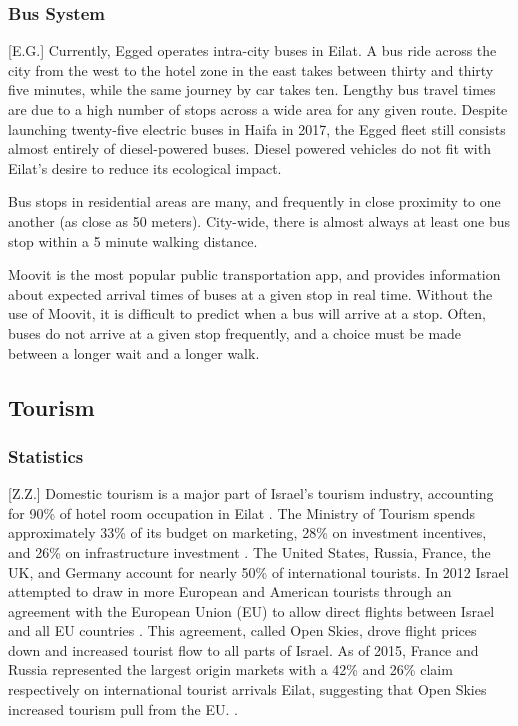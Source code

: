 \documentclass[12pt]{article}                       %
\begin{document}
\subsubsection{Bus System}[E.G.]
Currently, Egged operates intra-city buses in Eilat. A bus ride across the city from the west to the hotel zone in the east takes between thirty and thirty five minutes, while the same journey by car takes ten. Lengthy bus travel times are due to a high number of stops across a wide area for any given route. Despite launching twenty-five electric buses in Haifa in 2017, the Egged fleet still consists almost entirely of diesel-powered buses. Diesel powered vehicles do not fit with Eilat's desire to reduce its ecological impact.

Bus stops in residential areas are many, and frequently in close proximity to one another (as close as 50 meters). City-wide, there is almost always at least one bus stop within a 5 minute walking distance.

Moovit is the most popular public transportation app, and provides information about expected arrival times of buses at a given stop in real time. Without the use of Moovit, it is difficult to predict when a bus will arrive at a stop. Often, buses do not arrive at a given stop frequently, and a choice must be made between a longer wait and a longer walk.

\subsection{Tourism}
\subsubsection{Statistics}[Z.Z.]
Domestic tourism is a major part of Israel's tourism industry, accounting for 90\% of hotel room occupation in Eilat \cite{Benner2017UpgradingEilat}. The Ministry of Tourism spends approximately 33\% of its budget on marketing, 28\% on investment incentives, and 26\% on infrastructure investment \cite{Benner2017UpgradingEilat}. The United States, Russia, France, the UK, and Germany account for nearly 50\% of international tourists. In 2012 Israel attempted to draw in more European and American tourists through an agreement with the European Union (EU) to allow direct flights between Israel and all EU countries \cite{Benner2017UpgradingEilat}. This agreement, called Open Skies, drove flight prices down and increased tourist flow to all parts of Israel. As of 2015, France and Russia represented the largest origin markets with a 42\% and 26\% claim respectively on international tourist arrivals Eilat, suggesting that Open Skies increased tourism pull from the EU. \cite{Benevolo2016SmartBenefits}.
\end{document}
